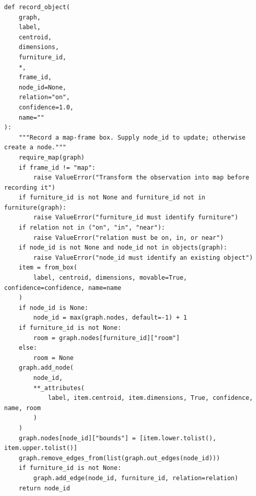 \documentclass[11pt,a4paper]{book}
\begin{document}
\begin{lstlisting}[firstnumber=158]
def record_object(
    graph,
    label,
    centroid,
    dimensions,
    furniture_id,
    *,
    frame_id,
    node_id=None,
    relation="on",
    confidence=1.0,
    name=""
):
    """Record a map-frame box. Supply node_id to update; otherwise create a node."""
    require_map(graph)
    if frame_id != "map":
        raise ValueError("Transform the observation into map before recording it")
    if furniture_id is not None and furniture_id not in furniture(graph):
        raise ValueError("furniture_id must identify furniture")
    if relation not in ("on", "in", "near"):
        raise ValueError("relation must be on, in, or near")
    if node_id is not None and node_id not in objects(graph):
        raise ValueError("node_id must identify an existing object")
    item = from_box(
        label, centroid, dimensions, movable=True, confidence=confidence, name=name
    )
    if node_id is None:
        node_id = max(graph.nodes, default=-1) + 1
    if furniture_id is not None:
        room = graph.nodes[furniture_id]["room"]
    else:
        room = None
    graph.add_node(
        node_id,
        **_attributes(
            label, item.centroid, item.dimensions, True, confidence, name, room
        )
    )
    graph.nodes[node_id]["bounds"] = [item.lower.tolist(), item.upper.tolist()]
    graph.remove_edges_from(list(graph.out_edges(node_id)))
    if furniture_id is not None:
        graph.add_edge(node_id, furniture_id, relation=relation)
    return node_id


\end{lstlisting}
\end{document}

